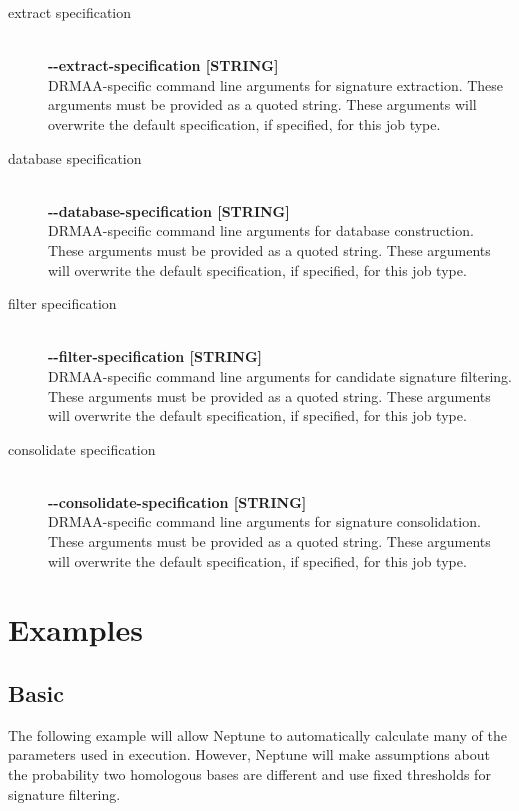 \documentclass[a4paper,10pt]{article}
\begin{document}
\begin{description}
  \item[extract specification] \hfill \\
  \textbf{-{}-extract-specification [STRING]} \hfill \\
  DRMAA-specific command line arguments for signature extraction. These arguments must be provided as a quoted string. These arguments will overwrite the default specification, if specified, for this job type.
  
  \item[database specification] \hfill \\
  \textbf{-{}-database-specification [STRING]} \hfill \\
  DRMAA-specific command line arguments for database construction. These arguments must be provided as a quoted string. These arguments will overwrite the default specification, if specified, for this job type.
  
  \item[filter specification] \hfill \\
  \textbf{-{}-filter-specification [STRING]} \hfill \\
  DRMAA-specific command line arguments for candidate signature filtering. These arguments must be provided as a quoted string. These arguments will overwrite the default specification, if specified, for this job type.
  
  \item[consolidate specification] \hfill \\
  \textbf{-{}-consolidate-specification [STRING]} \hfill \\
  DRMAA-specific command line arguments for signature consolidation. These arguments must be provided as a quoted string. These arguments will overwrite the default specification, if specified, for this job type.
  
\end{description}

\newpage
\section{Examples}

\subsection{Basic}

The following example will allow Neptune to automatically calculate many of the parameters used in execution. However, Neptune will make assumptions about the probability two homologous bases are different and use fixed thresholds for signature filtering.
\end{document}
